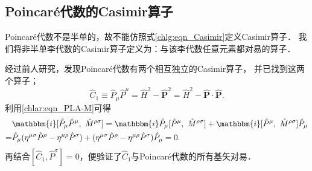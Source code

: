 
\subsection{Poincar\'{e}代数的Casimir算子}\label{chlar:sec_PC}
Poincar\'{e}代数不是半单的，故不能仿照式\eqref{chlg:eqn_Casimir}定义Casimir算子．
我们将非半单李代数的Casimir算子定义为：{\kaishu 与该李代数任意元素都对易的算子．}

经过前人研究，发现Poincar\'{e}代数有两个相互独立的Casimir算子，
并已找到这两个算子；
\begin{equation}\label{chlar:eqn_PA-Casimir-P2}
	\hat{C}_1 \equiv \hat{P}_\mu \hat{P}^\mu = \hat{H}^2 - \boldsymbol{\hat{P}}^2
	= \hat{H}^2 - \boldsymbol{\hat{P}}\cdot \boldsymbol{\hat{P}}.
\end{equation}
利用\eqref{chlar:eqn_PLA-M}可得
\begin{align*}
	&\mathbbm{i} [\hat{P}_\mu\hat{P}^\mu,\ \hat{M}^{\rho\sigma}] = 
	\mathbbm{i} \hat{P}_\mu [\hat{P}^\mu,\ \hat{M}^{\rho\sigma}] +\mathbbm{i} [\hat{P}^\mu,\ \hat{M}^{\rho\sigma}] \hat{P}_\mu \\
	=& \hat{P}_\mu(\eta^{\mu \sigma} \hat{P}^\rho-\eta^{\mu \rho} \hat{P}^\sigma)
	+(\eta^{\mu \sigma} \hat{P}^\rho-\eta^{\mu \rho} \hat{P}^\sigma)\hat{P}_\mu=0.
\end{align*}
再结合$[\hat{C}_1, \hat{P}^\sigma]=0$，便验证了$\hat{C}_1$与Poincar\'{e}代数的所有基矢对易．



